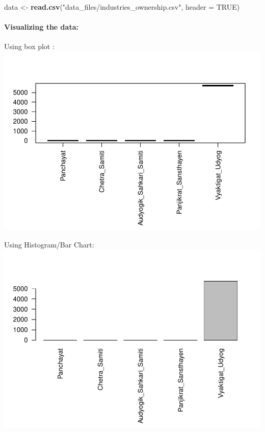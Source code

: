 \documentclass[]{article}
\newenvironment{Shaded}{\begin{snugshade}}{\end{snugshade}}
\newcommand{\KeywordTok}[1]{\textcolor[rgb]{0.13,0.29,0.53}{\textbf{#1}}}
\newcommand{\DataTypeTok}[1]{\textcolor[rgb]{0.13,0.29,0.53}{#1}}
\newcommand{\StringTok}[1]{\textcolor[rgb]{0.31,0.60,0.02}{#1}}
\newcommand{\OtherTok}[1]{\textcolor[rgb]{0.56,0.35,0.01}{#1}}
\newcommand{\NormalTok}[1]{#1}
\let\oldparagraph\paragraph
\renewcommand{\paragraph}[1]{\oldparagraph{#1}\mbox{}}
\begin{document}
\begin{Shaded}
\begin{Highlighting}[]
\NormalTok{data <-}\StringTok{ }\KeywordTok{read.csv}\NormalTok{(}\StringTok{"data_files/industries_ownership.csv"}\NormalTok{, }\DataTypeTok{header =} \OtherTok{TRUE}\NormalTok{)}
\end{Highlighting}
\end{Shaded}

\paragraph{Visualizing the data:}\label{visualizing-the-data-2}

Using box plot :
\includegraphics{Report_files/figure-latex/unnamed-chunk-10-1.pdf}

Using Histogram/Bar Chart:
\includegraphics{Report_files/figure-latex/unnamed-chunk-11-1.pdf}
\end{document}
